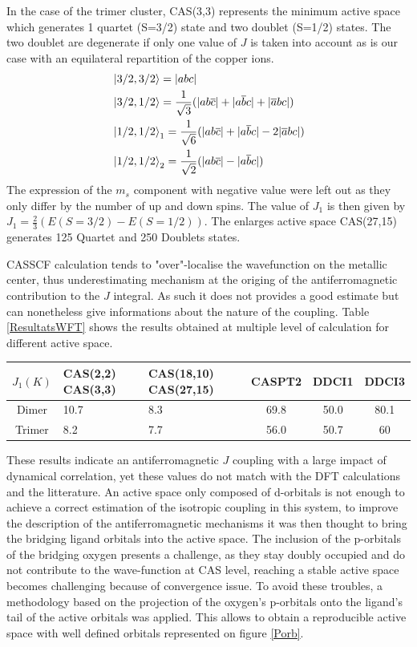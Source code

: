 \documentclass[10pt]{report}
\numberwithin{equation}{section}
\begin{document}
In the case of the trimer cluster, CAS(3,3) represents the minimum active space which generates 1 quartet (S=3/2) state and two doublet (S=1/2) states. The two doublet are degenerate if only one value of $J$ is taken into account as is our case with an equilateral repartition of the copper ions.
\begin{align}
    &\ket{3/2,3/2}=|abc|\\
    &\ket{3/2,1/2}=\frac{1}{\sqrt{3}}(|ab\overline{c}|+|a\overline{b}c|+|\overline{a}bc|)\\
    &\ket{1/2,1/2}_1=\frac{1}{\sqrt{6}}(|ab\overline{c}|+|a\overline{b}c|-2|\overline{a}bc|)\\
    &\ket{1/2,1/2}_2=\frac{1}{\sqrt{2}}(|ab\overline{c}|-|a\overline{b}c|)
\end{align}
The expression of the $m_s$ component with negative value were left out as they only differ by the number of up and down spins.
The value of $J_1$ is then given by $J_1=\frac{2}{3}(E(S=3/2)-E(S=1/2))$.
The enlarges active space CAS(27,15) generates 125 Quartet and 250 Doublets states.

CASSCF calculation tends to "over"-localise the wavefunction on the metallic center, thus underestimating mechanism at the origing of the antiferromagnetic contribution to the $J$ integral.
As such it does not provides a good estimate but can nonetheless give informations about the nature of the coupling.
Table \ref{ResultatsWFT} shows the results obtained at multiple level of calculation for different active space.

\begin{center}\label{ResultatsWFT}
    \begin{tabular}{c m{8em} m{10em} c c c }
        \hline
        $J_1 (K)$ & CAS(2,2) CAS(3,3) & CAS(18,10) CAS(27,15) & CASPT2 & DDCI1  & DDCI3  \\
        \hline
        Dimer & 10.7 & 8.3 & 69.8 & 50.0 & 80.1 \\
        Trimer & 8.2 & 7.7 & 56.0  & 50.7 & 60 \\
        \hline
    \end{tabular}
\end{center}

These results indicate an antiferromagnetic $J$ coupling with a large impact of dynamical correlation, yet these values do not match with the DFT calculations and the litterature.
An active space only composed of d-orbitals is not enough to achieve a correct estimation of the isotropic coupling in this system, to improve the description of the antiferromagnetic mechanisms it was then thought to bring the bridging ligand orbitals into the active space.
The inclusion of the p-orbitals of the bridging oxygen presents a challenge, as they stay doubly occupied and do not contribute to the wave-function at CAS level, reaching a stable active space becomes challenging because of convergence issue.
To avoid these troubles, a methodology based on the projection of the oxygen's p-orbitals onto the ligand's tail of the active orbitals was applied.
This allows to obtain a reproducible active space with well defined orbitals represented on figure \ref{Porb}.
\end{document}
